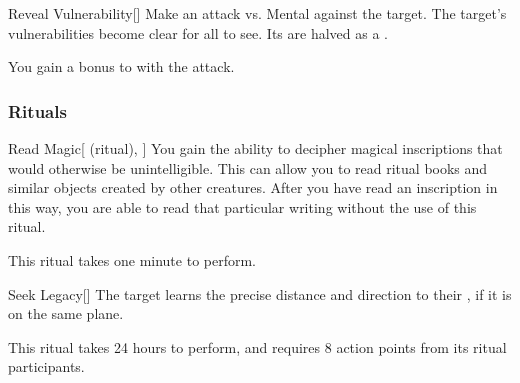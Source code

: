 \lowercase{\hypertarget{spell:Reveal Vulnerability}{}}\label{spell:Reveal Vulnerability}
\begin{freeability}[Rank 6]{\hypertarget{spell:Reveal Vulnerability}{Reveal Vulnerability}}[]
Make an attack vs. Mental against the target.
\hit The target's vulnerabilities become clear for all to see.
Its  are halved as a .

\rankline
{} You gain a  bonus to  with the attack.
\end{freeability}
\vspace{0.25em}



\subsubsection{Rituals}


\lowercase{\hypertarget{spell:Read Magic}{}}\label{spell:Read Magic}
\begin{attuneability}[Rank 1]{\hypertarget{spell:Read Magic}{Read Magic}}[ (ritual), ]
You gain the ability to decipher magical inscriptions that would otherwise be unintelligible.
This can allow you to read ritual books and similar objects created by other creatures.
After you have read an inscription in this way, you are able to read that particular writing without the use of this ritual.

This ritual takes one minute to perform.
\end{attuneability}
\vspace{0.25em}



\lowercase{\hypertarget{spell:Seek Legacy}{}}\label{spell:Seek Legacy}
\begin{apability}[Rank 3]{\hypertarget{spell:Seek Legacy}{Seek Legacy}}[]
The target learns the precise distance and direction to their , if it is on the same plane.

This ritual takes 24 hours to perform, and requires 8 action points from its ritual participants.
\end{apability}
\vspace{0.25em}



